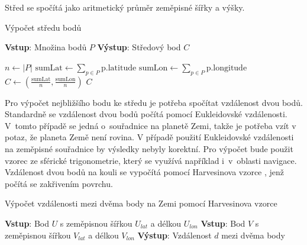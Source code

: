 \newpage
\noindent
Střed se spočítá jako aritmetický průměr zeměpisné šířky a výšky.

\begin{algorithm}
\caption{Výpočet středu bodů}
\begin{algorithmic}[1]
    \State \textbf{Vstup}: Množina bodů $P$
    \State \textbf{Výstup}: Středový bod $C$
    
    \State $n \gets |P|$
    \State $ \text{sumLat} \gets \sum\limits_{p \in P} \text{p.latitude}$
    \State $ \text{sumLon} \gets \sum\limits_{p \in P} \text{p.longitude}$
    \State $C \gets \left( \frac{\text{sumLat}}{n}, \frac{\text{sumLon}}{n} \right)$
    \State \Return $C$
\EndFunction
\end{algorithmic}
\end{algorithm}
\noindent
Pro výpočet nejbližšího bodu ke středu je potřeba spočítat vzdálenost dvou bodů. Standardně se vzdálenost dvou bodů počítá pomocí Eukleidovské vzdálenosti. V~tomto případě se jedná o~souřadnice na planetě Zemi, takže je potřeba vzít v potaz, že planeta Země není rovina. V případě použití Eukleidovské vzdálenosti na zeměpisné souřadnice by výsledky nebyly korektní. Pro výpočet bude použit vzorec ze sférické trigonometrie, který se využívá například i~v~oblasti navigace. Vzdálenost dvou bodů na kouli se vypočítá pomocí Harvesinova vzorce \cite{harvesinFormula}, jenž počítá se zakřivením povrchu.


\begin{algorithm}
\caption{Výpočet vzdálenosti mezi dvěma body na Zemi pomocí Harvesinova vzorce}
\begin{algorithmic}[1]

    \State \textbf{Vstup}: Bod $U$ s zeměpisnou šířkou $U_{lat}$ a délkou $U_{lon}$
    \State \textbf{Vstup}: Bod $V$ s zeměpisnou šířkou $V_{lat}$ a délkou $V_{lon}$
    \State \textbf{Výstup}: Vzdálenost $d$ mezi dvěma body
     
\EndFunction
\end{algorithmic}
\end{algorithm}


